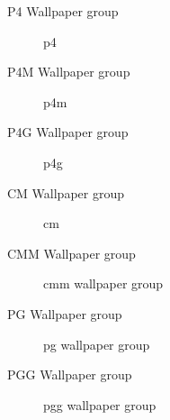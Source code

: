 \documentclass{beamer}
\theoremstyle{definition}
\begin{document}
\begin{frame}{P4 Wallpaper group}
    \begin{figure}
        \centering
        
        \caption{p4}
        \label{fig:p4}
    \end{figure}
\end{frame}

\begin{frame}{P4M Wallpaper group}
    \begin{figure}
        \centering
        
        \caption{p4m}
        \label{fig:p4m}
    \end{figure}
\end{frame}

\begin{frame}{P4G Wallpaper group}
    \begin{figure}
        \centering
        
        \caption{p4g}
        \label{fig:p4g}
    \end{figure}
\end{frame}

\begin{frame}{CM Wallpaper group}
    \begin{figure}
        \centering
        
        \caption{cm}
        \label{fig:cm}
    \end{figure}
\end{frame}

\begin{frame}{CMM Wallpaper group}
    \begin{figure}
        \centering
        
        \caption{cmm wallpaper group}
        \label{fig:cmm}
    \end{figure}
\end{frame}

\begin{frame}{PG Wallpaper group}
    \begin{figure}
        \centering
        
        \caption{pg wallpaper group}
        \label{fig:pg}
    \end{figure}
\end{frame}

\begin{frame}{PGG Wallpaper group}
    \begin{figure}
        \centering
        
        \caption{pgg wallpaper group}
        \label{fig:pgg}
    \end{figure}
\end{frame}
\end{document}
